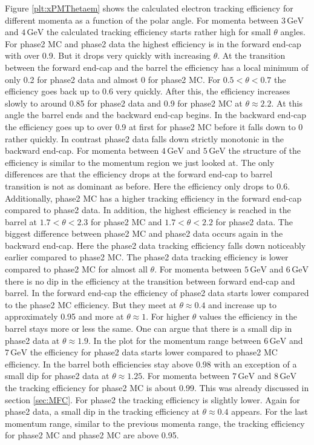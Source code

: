 \documentclass[a4paper,11pt,twosided,final,german,openbib,pdftex,listof=totoc,bibliography=totoc]{scrbook}
\begin{document}
Figure \ref{plt:xPMThetaem} shows the calculated electron tracking efficiency for different momenta as a function of the polar angle. For momenta between $3\,\textrm{GeV}$ and $4\,\textrm{GeV}$ the calculated tracking efficiency starts rather high for small $\theta$ angles. For phase2 MC and phase2 data the highest efficiency is in the forward end-cap with over 0.9. But it drops very quickly with increasing $\theta$. At the transition between the forward end-cap and the barrel the efficiency has a local minimum of only 0.2 for phase2 data and almost 0 for phase2 MC.
For $0.5 < \theta < 0.7$ the efficiency goes back up to 0.6 very quickly. After this, the efficiency increases slowly to around 0.85 for phase2 data and 0.9 for phase2 MC at $\theta \approx 2.2$. At this angle the barrel ends and the backward end-cap begins. 
In the backward end-cap the efficiency goes up to over 0.9 at first for phase2 MC before it falls down to 0 rather quickly. In contrast phase2 data falls down strictly monotonic in the backward end-cap. 
For momenta between $4\,\textrm{GeV}$ and $5\,\textrm{GeV}$ the structure of the efficiency is similar to the momentum region we just looked at. The only differences are that the efficiency drops at the forward end-cap to barrel transition is not as dominant as before. Here the efficiency only drops to 0.6. Additionally, phase2 MC has a higher tracking efficiency in the forward end-cap compared to phase2 data.
In addition, the highest efficiency is reached in the barrel at $1.7< \theta <2.3$ for phase2 MC and $1.7< \theta <2.2$ for phase2 data. The biggest difference between phase2 MC and phase2 data occurs again in the backward end-cap. Here the phase2 data tracking efficiency falls down noticeably earlier compared to phase2 MC. The phase2 data tracking efficiency is lower compared to phase2 MC for almost all $\theta$.
For momenta between $5\,\textrm{GeV}$ and $6\,\textrm{GeV}$ there is no dip in the efficiency at the transition between forward end-cap and barrel. In the forward end-cap the efficiency of phase2 data starts lower compared to the phase2 MC efficiency. But they meet at $\theta \approx 0.4$  and increase up to approximately 0.95 and more at $\theta \approx 1$.
For higher $\theta$ values the efficiency in the barrel stays more or less the same. One can argue that there is a small dip in phase2 data at $\theta \approx 1.9$.
In the plot for the momentum range between $6\,\textrm{GeV}$ and $7\,\textrm{GeV}$ the efficiency for phase2 data starts lower compared to phase2 MC efficiency. In the barrel both efficiencies stay above 0.98 with an exception of a small dip for phase2 data at $\theta \approx 1.25$. 
For momenta  between $7\,\textrm{GeV}$ and $8\,\textrm{GeV}$ the tracking efficiency for phase2 MC is about 0.99. This was already discussed in section \ref{sec:MFC}. For phase2 the tracking efficiency is slightly lower. Again for phase2 data, a small dip in the tracking efficiency at $\theta \approx 0.4$ appears. 
For the last momentum range, similar to the previous momenta range, the tracking efficiency for phase2 MC and phase2 MC are above 0.95.
 
\end{document}
